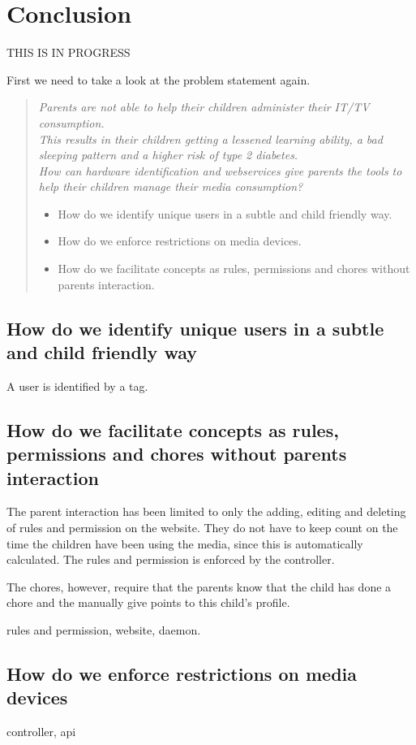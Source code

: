 \chapter{Conclusion}
THIS IS IN PROGRESS

First we need to take a look at the problem statement again.
\begin{verse}
\textit{Parents are not able to help their children administer their IT/TV consumption.\\
This results in their children getting a lessened learning ability, a bad sleeping pattern and a higher risk of type 2 diabetes.\\
How can hardware identification and webservices give parents the tools to help their children manage their media consumption?}
	\begin{itemize}
		\item How do we identify unique users in a subtle and child friendly way.
		\item How do we enforce restrictions on media devices.
		\item How do we facilitate concepts as rules, permissions and chores without parents interaction.
	\end{itemize}
\end{verse}

\section{How do we identify unique users in a subtle and child friendly way}
A user is identified by a tag. 


\section{How do we facilitate concepts as rules, permissions and chores without parents interaction}
The parent interaction has been limited to only the adding, editing and deleting of rules and permission on the website. They do not have to keep count on the time the children have been using the media, since this is automatically calculated. The rules and permission is enforced by the controller. 

The chores, however, require that the parents know that the child has done a chore and the manually give points to this child's profile. 


rules and permission, website, daemon.

\section{How do we enforce restrictions on media devices}
controller, api

